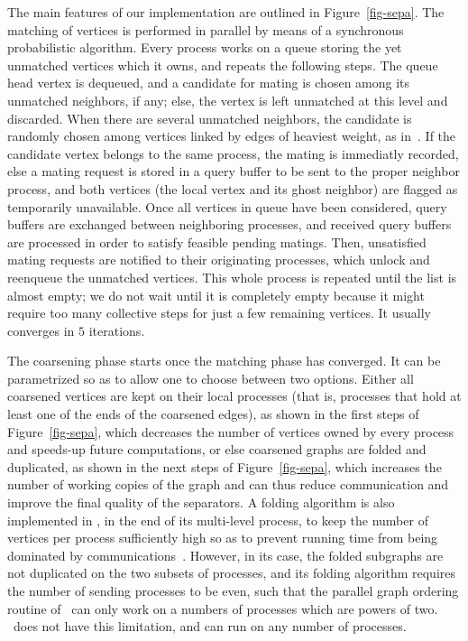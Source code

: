 \documentclass[fleqn,12pt,twoside]{article}
\begin{document}
The main features of our implementation are outlined in
Figure~\ref{fig-sepa}. The matching of vertices is performed in
parallel by means of a synchronous probabilistic algorithm. Every
process works on a queue storing the yet unmatched vertices which it
owns, and repeats the following steps. The queue head vertex is
dequeued, and a candidate for mating is chosen among its unmatched
neighbors, if any; else, the vertex is left unmatched at this level
and discarded. When there are several unmatched neighbors, the
candidate is randomly chosen among vertices linked by edges of
heaviest weight, as in~\cite{kaku95a}. If the candidate vertex belongs
to the same process, the mating is immediatly recorded, else a
mating request is stored in a query buffer to be sent to the proper
neighbor process, and both vertices (the local vertex and its ghost
neighbor) are flagged as temporarily unavailable. Once all vertices in
queue have been considered, query buffers are exchanged between
neighboring processes, and received query buffers are processed in
order to satisfy feasible pending matings. Then, unsatisfied mating
requests are notified to their originating processes, which unlock
and reenqueue the unmatched vertices. This whole process is repeated
until the list is almost empty; we do not wait until it is completely
empty because it might require too many collective steps for just a
few remaining vertices. It usually converges in $5$ iterations.

The coarsening phase starts once the matching phase has converged. It
can be para\-me\-triz\-ed so as to allow one to choose between two
options. Either all coarsened vertices are kept on their local
processes (that is, processes that hold at least one of the ends of
the coarsened edges), as shown in the first steps of
Figure~\ref{fig-sepa}, which decreases the number of vertices owned by
every process and speeds-up future computations, or else coarsened
graphs are folded and duplicated, as shown in the next steps of
Figure~\ref{fig-sepa}, which increases the number of working copies of
the graph and can thus reduce communication and improve the final
quality of the separators. A folding algorithm is also implemented in
\parmetis, in the end of its multi-level process, to keep the number
of vertices per process sufficiently high so as to prevent running
time from being dominated by communications~\cite{kaku97}. However, in
its case, the folded subgraphs are not duplicated on the two subsets
of processes, and its folding algorithm requires the number of
sending processes to be even, such that the parallel graph ordering
routine of \parmetis\ can only work on a numbers of processes which
are powers of two. \ptscotch\ does not have this limitation, and can
run on any number of processes.
\end{document}
